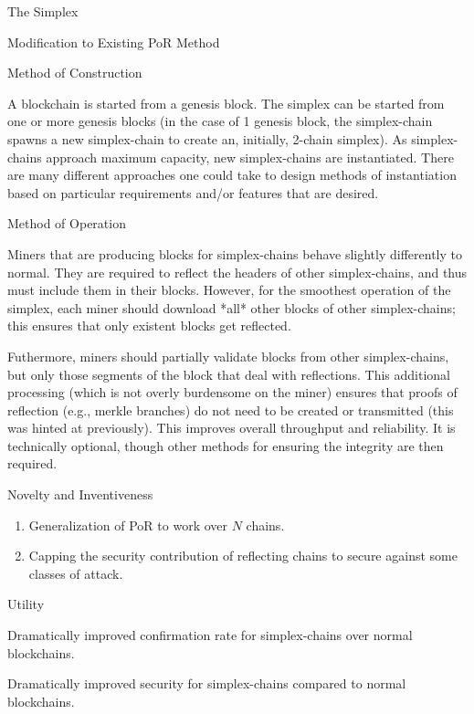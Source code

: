 \begin{section}{The Simplex}
\begin{subsection}{Modification to Existing PoR Method}
 \end{subsection}
 \begin{subsection}{Method of Construction}

    A blockchain is started from a genesis block. The simplex can be started from one or more genesis blocks (in the case of 1 genesis block, the simplex-chain spawns a new simplex-chain to create an, initially, 2-chain simplex). As simplex-chains approach maximum capacity, new simplex-chains are instantiated. There are many different approaches one could take to design methods of instantiation based on particular requirements and/or features that are desired.

 \end{subsection}
 \begin{subsection}{Method of Operation}

    Miners that are producing blocks for simplex-chains behave slightly differently to normal. They are required to reflect the headers of other simplex-chains, and thus must include them in their blocks. However, for the smoothest operation of the simplex, each miner should download *all* other blocks of other simplex-chains; this ensures that only existent blocks get reflected.

    Futhermore, miners should partially validate blocks from other simplex-chains, but only those segments of the block that deal with reflections. This additional processing (which is not overly burdensome on the miner) ensures that proofs of reflection (e.g., merkle branches) do not need to be created or transmitted (this was hinted at previously). This improves overall throughput and reliability. It is technically optional, though other methods for ensuring the integrity are then required.

 \end{subsection}
 \begin{subsection}{Novelty and Inventiveness}

     \begin{enumerate}
         \def\labelenumi{\arabic{enumi}.}
         \tightlist
         \item
               Generalization of PoR to work over $N$ chains.
         \item
               Capping the security contribution of reflecting chains to secure against some classes of attack.
     \end{enumerate}

 \end{subsection}
 \begin{subsection}{Utility}

     Dramatically improved confirmation rate for simplex-chains over normal blockchains.

     Dramatically improved security for simplex-chains compared to normal blockchains.

 \end{subsection}
\end{section}

